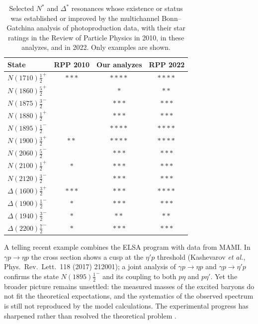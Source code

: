 \begin{table}[t]
    \centering
    \begin{tabular}{lccc}
        \hline
        State & RPP 2010 & Our analyzes & RPP 2022 \\
        \hline
        $N(1710)\tfrac{1}{2}^+$   & $\ast\ast\ast$ & $\ast\ast\ast\ast$ & $\ast\ast\ast\ast$ \\
        $N(1860)\tfrac{5}{2}^+$   &                & $\ast$             & $\ast\ast$ \\
        $N(1875)\tfrac{3}{2}^-$   &                & $\ast\ast\ast$     & $\ast\ast\ast$ \\
        $N(1880)\tfrac{1}{2}^+$   &                & $\ast\ast\ast$     & $\ast\ast\ast$ \\
        $N(1895)\tfrac{1}{2}^-$   &                & $\ast\ast\ast\ast$ & $\ast\ast\ast\ast$ \\
        $N(1900)\tfrac{3}{2}^+$   & $\ast\ast$     & $\ast\ast\ast\ast$ & $\ast\ast\ast\ast$ \\
        $N(2060)\tfrac{5}{2}^-$   &                & $\ast\ast\ast$     & $\ast\ast\ast$ \\
        $N(2100)\tfrac{1}{2}^+$   & $\ast$         & $\ast\ast\ast$     & $\ast\ast\ast$ \\
        $N(2120)\tfrac{3}{2}^-$   &                & $\ast\ast\ast$     & $\ast\ast\ast$ \\
        $\Delta(1600)\tfrac{3}{2}^+$ & $\ast\ast\ast$ & $\ast\ast\ast$  & $\ast\ast\ast\ast$ \\
        $\Delta(1900)\tfrac{1}{2}^-$ & $\ast$      & $\ast\ast\ast$     & $\ast\ast\ast$ \\
        $\Delta(1940)\tfrac{3}{2}^-$ & $\ast$      & $\ast\ast$         & $\ast\ast$ \\
        $\Delta(2200)\tfrac{7}{2}^-$ & $\ast$      & $\ast\ast\ast$     & $\ast\ast\ast$ \\
        \hline
    \end{tabular}
    \caption{Selected $N^{*}$ and $\Delta^{*}$ resonances whose existence or status was
    established or improved by the multichannel Bonn--Gatchina analysis of photoproduction
    data, with their star ratings in the Review of Particle Physics in 2010, in these
    analyzes, and in 2022. Only examples are shown.}
    \label{tab:bnga-states}
\end{table}

A telling recent example combines the ELSA program with data from MAMI. In
$\gamma p \to \eta p$ the cross section shows a cusp at the $\eta' p$ threshold
(Kashevarov \textit{et al.}, Phys.\ Rev.\ Lett.\ 118 (2017) 212001); a joint analysis of
$\gamma p \to \eta p$ and $\gamma p \to \eta' p$ confirms the state
$N(1895)\tfrac{1}{2}^-$ and its coupling to both $p\eta$ and $p\eta'$. Yet the broader
picture remains unsettled: the measured masses of the excited baryons do not fit the
theoretical expectations, and the systematics of the observed spectrum is still not
reproduced by the model calculations. The experimental progress has sharpened rather than
resolved the theoretical problem \cite[Ch.~15]{Amsler2018}.

